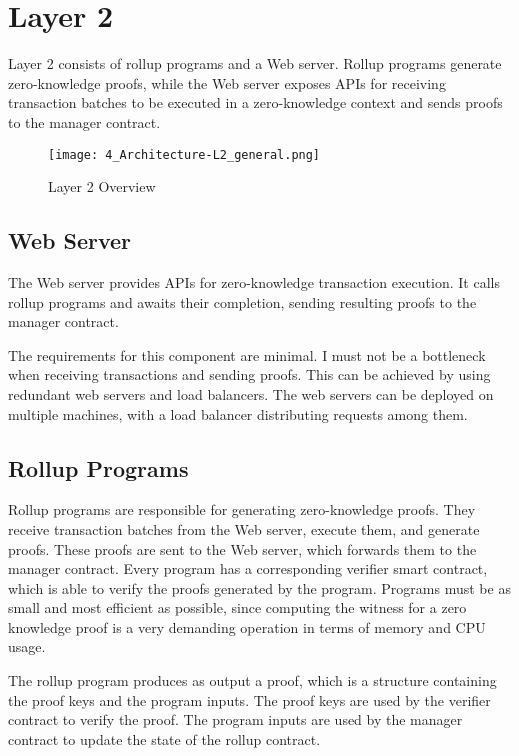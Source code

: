 \section{Layer 2\label{sec:designLayer2}}
Layer 2 consists of rollup programs and a Web server. Rollup programs generate zero-knowledge proofs, while the Web server exposes APIs for receiving transaction batches to be executed in a zero-knowledge context and sends proofs to the manager contract.

\begin{figure}[htb]
  \centering
  \texttt{[image: 4\_Architecture-L2\_general.png]}
  \caption{Layer 2 Overview}
  \label{fig:Layer2overview}
\end{figure}

\subsection{Web Server\label{sec:designwebserver}}
The Web server provides APIs for zero-knowledge transaction execution. It calls rollup programs and awaits their completion, sending resulting proofs to the manager contract.

The requirements for this component are minimal. I must not be a bottleneck when receiving transactions and sending proofs. This can be achieved by using redundant web servers and load balancers. The web servers can be deployed on multiple machines, with a load balancer distributing requests among them.

\subsection{Rollup Programs\label{sec:designrollupprograms}}
Rollup programs are responsible for generating zero-knowledge proofs. They receive transaction batches from the Web server, execute them, and generate proofs. These proofs are sent to the Web server, which forwards them to the manager contract. Every program has a corresponding verifier smart contract, which is able to verify the proofs generated by the program. Programs must be as small and most efficient as possible, since computing the witness for a zero knowledge proof is a very demanding operation in terms of memory and CPU usage.

The rollup program produces as output a proof, which is a structure containing the proof keys and the program inputs. The proof keys are used by the verifier contract to verify the proof. The program inputs are used by the manager contract to update the state of the rollup contract.